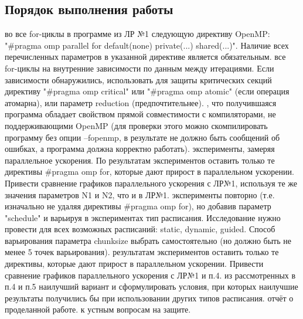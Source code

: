 { %
	\subsection{Порядок выполнения работы}
	\Large
	\begin{enumerate}
		 во все for-циклы в программе из ЛР №1 следующую директиву OpenMP: \\	
"\#pragma omp parallel for default(none) private(...) shared(...)". Наличие всех перечисленных параметров в указанной директиве является обязательным.
		 все for-циклы на внутренние зависимости по данным между итерациями. Если зависимости обнаружились, использовать для защиты критических секций директиву "\#pragma omp critical" или "\#pragma omp atomic" (если операция атомарна), или параметр reduction (предпочтительнее).
		, что получившаяся программа обладает свойством прямой совместимости с компиляторами, не поддерживающими OpenMP (для проверки этого можно скомпилировать программу без опции –fopenmp, в результате не должно быть сообщений об ошибках, а программа должна корректно работать).
		 эксперименты, замеряя параллельное ускорения. По результатам экспериментов оставить только те директивы \#pragma omp for, которые дают прирост в параллельном ускорении. Привести сравнение графиков параллельного ускорения с ЛР№1, используя те же значения параметров N1 и N2, что и в ЛР№1. 
		 эксперименты повторно (т.е. изначально не удаляя директивы \#pragma omp for), но добавив параметр "schedule" и варьируя в экспериментах тип расписания. Исследование нужно провести для всех возможных расписаний: static, dynamic, guided. Способ варьирования параметра chunk\textunderscore size выбрать самостоятельно (но должно быть не менее 5 точек варьирования).
		 результатам экспериментов оставить только те директивы, которые дают прирост в параллельном ускорении. Привести сравнение графиков параллельного ускорения с ЛР№1 и п.4. 
		 из рассмотренных в п.4 и п.5 наилучший вариант и сформулировать условия, при которых наилучшие результаты получились бы при использовании других типов расписания.
		 отчёт о проделанной работе.
		 к устным вопросам на защите.
	\end{enumerate}
}